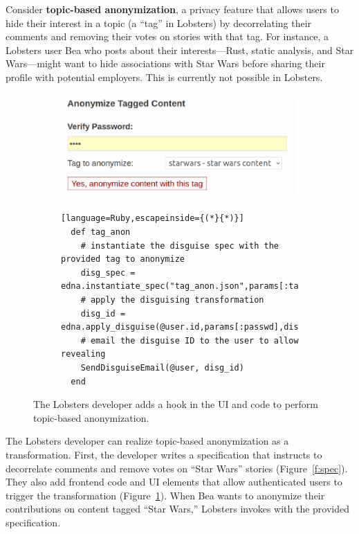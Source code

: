 Consider \textbf{topic-based anonymization}, a privacy feature that allows users to
hide their interest in a topic (a ``tag'' in Lobsters) by decorrelating
their comments and removing their votes on stories with that tag.
%
For instance, a Lobsters user Bea who posts about their interests---Rust,
static analysis, and Star Wars---might want to hide associations with
Star Wars before sharing their profile with potential employers.
%
This is currently not possible in Lobsters.

\begin{figure}[t]
  \centering
  \begin{subfigure}[t]{0.5\columnwidth}
  \includegraphics[width=\columnwidth]{figs/lobsters_catanon}
  \end{subfigure}
  \begin{subfigure}[t]{\columnwidth}
  \begin{lstlisting}[language=Ruby,escapeinside={(*}{*)}]
  def tag_anon
    # instantiate the disguise spec with the provided tag to anonymize
    disg_spec = edna.instantiate_spec("tag_anon.json",params[:tag])
    # apply the disguising transformation
    disg_id = edna.apply_disguise(@user.id,params[:passwd],disg_spec)
    # email the disguise ID to the user to allow revealing
    SendDisguiseEmail(@user, disg_id)
  end
  \end{lstlisting}
  \end{subfigure}
  \vspace*{-1em}
    \caption[Hook to invoke topic-based anonymization.]{The Lobsters developer adds a hook in the UI and code to perform
      topic-based anonymization.}
  \label{f:lobsters_hook}
  \end{figure}

%
The Lobsters developer can realize topic-based anonymization as a \xxing
transformation.
%
First, the developer writes a \xx specification that instructs \sys to
decorrelate comments and remove votes on ``Star Wars'' stories
(Figure~\ref{f:spec}).
%
They also add frontend code and UI elements that allow authenticated users to
trigger the \xxing transformation (Figure~\ref{f:lobsters_hook}).
%
When Bea wants to anonymize their contributions on content tagged ``Star Wars,''
Lobsters invokes \sys with the provided specification.

